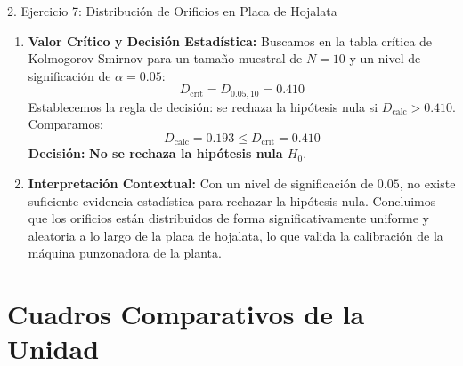 \documentclass[11pt,a4paper]{article}
\begin{document}
\begin{subsection}{2. Ejercicio 7: Distribución de Orificios en Placa de Hojalata}
\begin{enumerate}
        \item \textbf{Valor Crítico y Decisión Estadística:}
              Buscamos en la tabla crítica de Kolmogorov-Smirnov para un tamaño muestral de $N = 10$ y un nivel de significación de $\alpha = 0.05$:
              \[ D_{\text{crit}} = D_{0.05, 10} = \mathbf{0.410} \]
              Establecemos la regla de decisión: se rechaza la hipótesis nula si $D_{\text{calc}} > 0.410$.
              Comparamos:
              \[ D_{\text{calc}} = 0.193 \le D_{\text{crit}} = 0.410 \]
              \textbf{Decisión:} \textbf{No se rechaza la hipótesis nula $H_0$}.
        \item \textbf{Interpretación Contextual:}
              Con un nivel de significación de $0.05$, no existe suficiente evidencia estadística para rechazar la hipótesis nula. Concluimos que los orificios están distribuidos de forma significativamente uniforme y aleatoria a lo largo de la placa de hojalata, lo que valida la calibración de la máquina punzonadora de la planta.
    \end{enumerate}
\end{subsection}

\newpage
\section{Cuadros Comparativos de la Unidad}
\end{document}

